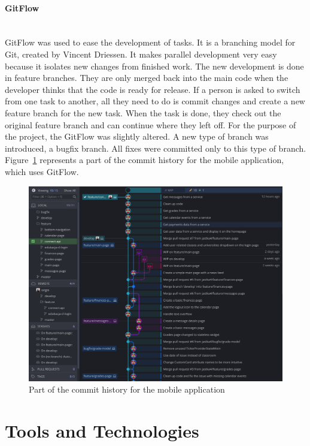 \paragraph{\large{GitFlow}}\mbox{}\\[2pt]
GitFlow was used to ease the development of tasks. It is a branching model for Git, created by Vincent Driessen. It makes parallel development very easy because it isolates new changes from finished work. The new development is done in feature branches. They are only merged back into the main code when the developer thinks that the code is ready for release. If a person is asked to switch from one task to another, all they need to do is commit changes and create a new feature branch for the new task. When the task is done, they check out the original feature branch and can continue where they left off.
For the purpose of the project, the GitFlow was slightly altered. A new type of branch was introduced, a bugfix branch. All fixes were committed only to this type of branch. Figure~\ref{fig:gitflow} represents a part of the commit history for the mobile application, which uses GitFlow.

\begin{figure}[htb]
    \centering
    \includegraphics[width=\textwidth]{fig04/gitflow.png}
    \caption{Part of the commit history for the mobile application} \label{fig:gitflow}
\end{figure}

\section{Tools and Technologies}
